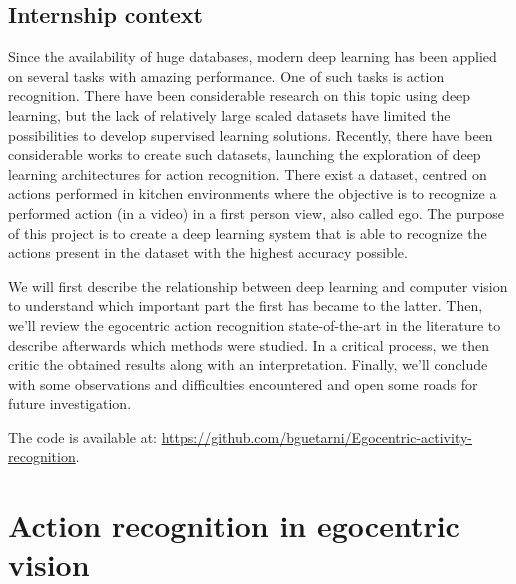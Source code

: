\documentclass[12pt, a4paper]{report}
\begin{document}
		\section{Internship context}
			Since the availability of huge databases, modern deep learning has been applied on several tasks with amazing performance.
			One of such tasks is action recognition.
			There have been considerable research on this topic using deep learning, but the lack of relatively large scaled datasets have limited the possibilities to develop supervised learning solutions.
			Recently, there have been considerable works to create such datasets, launching the exploration of deep learning architectures for action recognition.
			There exist a dataset, centred on actions performed in kitchen environments where the objective is to recognize a performed action (in a video) in a first person view, also called \gls{ego}.
			The purpose of this project is to create a deep learning system that is able to recognize the actions present in the dataset with the highest accuracy possible.
			\par
			\bigbreak
			We will first describe the relationship between deep learning and computer vision to understand which important part the first has became to the latter.
			Then, we'll review the egocentric action recognition state-of-the-art in the literature to describe afterwards which methods were studied.
			In a critical process, we then critic the obtained results along with an interpretation.
			Finally, we'll conclude with some observations and difficulties encountered and open some roads for future investigation.
			\par
			\bigbreak
			The code is available at: \url{https://github.com/bguetarni/Egocentric-activity-recognition}.
	\chapter{Action recognition in egocentric vision}
\end{document}
